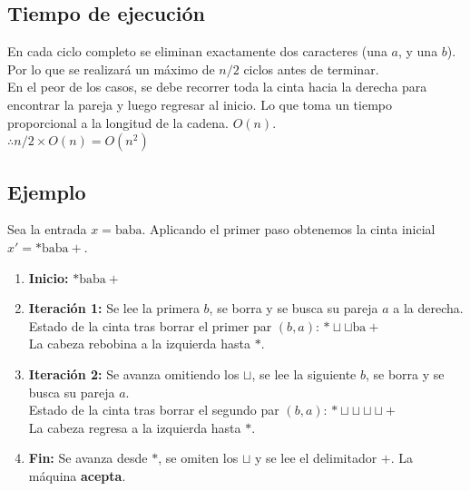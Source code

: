 \subsection{Tiempo de ejecución}
En cada ciclo completo se eliminan exactamente dos caracteres (una $a$, y una $b$). Por lo que se realizará un máximo de $n/{2}$ ciclos antes de terminar.\\
En el peor de los casos, se debe recorrer toda la cinta hacia la derecha para encontrar la pareja y luego regresar al inicio. Lo que toma un tiempo proporcional a la longitud de la cadena. $O(n)$.\\
$\therefore n/2 \times O(n) =O(n^2)$
\subsection{Ejemplo}
Sea la entrada $x = \text{baba}$. Aplicando el primer paso obtenemos la cinta inicial $x' = *\text{baba}+$.

\begin{enumerate}
    \item \textbf{Inicio:} $*\text{baba}+$
    \item \textbf{Iteración 1:} Se lee la primera $b$, se borra y se busca su pareja $a$ a la derecha. \\
    Estado de la cinta tras borrar el primer par $(b,a)$: $* \sqcup \sqcup \text{ba}+$ \\
    La cabeza rebobina a la izquierda hasta $*$.
    
    \item \textbf{Iteración 2:} Se avanza omitiendo los $\sqcup$, se lee la siguiente $b$, se borra y se busca su pareja $a$. \\
    Estado de la cinta tras borrar el segundo par $(b,a)$: $* \sqcup \sqcup \sqcup \sqcup +$ \\
    La cabeza regresa a la izquierda hasta $*$.
    
    \item \textbf{Fin:} Se avanza desde $*$, se omiten los $\sqcup$ y se lee el delimitador $+$. La máquina \textbf{acepta}.
\end{enumerate}



